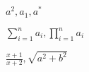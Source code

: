 $a^2, a_1, a^{*}$ %

$\sum_{i=1}^n a_i, \prod_{i=1}^n a_i$ %

$\frac{x + 1}{x + 2}, \sqrt{a^2 + b^2}$ %
